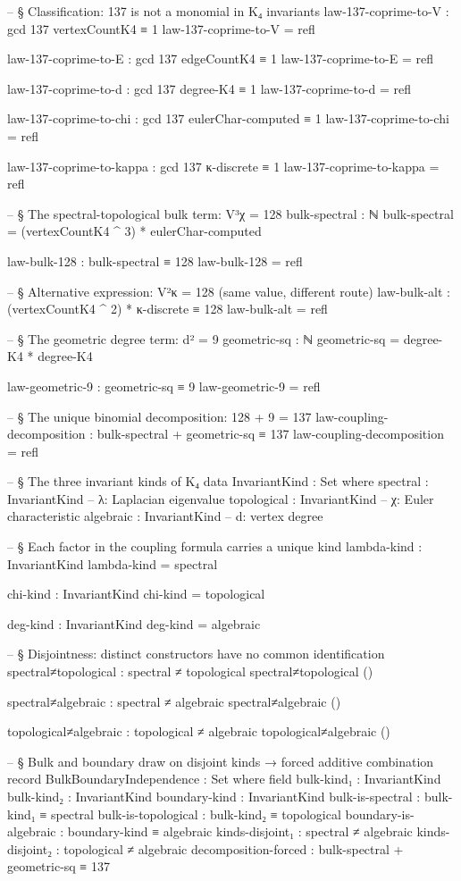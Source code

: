 \documentclass[11pt,a4paper]{book}
\begin{document}
\begin{code}
-- § Classification: 137 is not a monomial in K₄ invariants
law-137-coprime-to-V : gcd 137 vertexCountK4 ≡ 1
law-137-coprime-to-V = refl

law-137-coprime-to-E : gcd 137 edgeCountK4 ≡ 1
law-137-coprime-to-E = refl

law-137-coprime-to-d : gcd 137 degree-K4 ≡ 1
law-137-coprime-to-d = refl

law-137-coprime-to-chi : gcd 137 eulerChar-computed ≡ 1
law-137-coprime-to-chi = refl

law-137-coprime-to-kappa : gcd 137 κ-discrete ≡ 1
law-137-coprime-to-kappa = refl

-- § The spectral-topological bulk term: V³χ = 128
bulk-spectral : ℕ
bulk-spectral = (vertexCountK4 ^ 3) * eulerChar-computed

law-bulk-128 : bulk-spectral ≡ 128
law-bulk-128 = refl

-- § Alternative expression: V²κ = 128 (same value, different route)
law-bulk-alt : (vertexCountK4 ^ 2) * κ-discrete ≡ 128
law-bulk-alt = refl

-- § The geometric degree term: d² = 9
geometric-sq : ℕ
geometric-sq = degree-K4 * degree-K4

law-geometric-9 : geometric-sq ≡ 9
law-geometric-9 = refl

-- § The unique binomial decomposition: 128 + 9 = 137
law-coupling-decomposition : bulk-spectral + geometric-sq ≡ 137
law-coupling-decomposition = refl


-- § The three invariant kinds of K₄
data InvariantKind : Set where
  spectral    : InvariantKind   -- λ: Laplacian eigenvalue
  topological : InvariantKind   -- χ: Euler characteristic
  algebraic   : InvariantKind   -- d: vertex degree

-- § Each factor in the coupling formula carries a unique kind
lambda-kind : InvariantKind
lambda-kind = spectral

chi-kind : InvariantKind
chi-kind = topological

deg-kind : InvariantKind
deg-kind = algebraic

-- § Disjointness: distinct constructors have no common identification
spectral≠topological : spectral ≠ topological
spectral≠topological ()

spectral≠algebraic : spectral ≠ algebraic
spectral≠algebraic ()

topological≠algebraic : topological ≠ algebraic
topological≠algebraic ()

-- § Bulk and boundary draw on disjoint kinds → forced additive combination
record BulkBoundaryIndependence : Set where
  field
    bulk-kind₁            : InvariantKind
    bulk-kind₂            : InvariantKind
    boundary-kind         : InvariantKind
    bulk-is-spectral      : bulk-kind₁ ≡ spectral
    bulk-is-topological   : bulk-kind₂ ≡ topological
    boundary-is-algebraic : boundary-kind ≡ algebraic
    kinds-disjoint₁       : spectral ≠ algebraic
    kinds-disjoint₂       : topological ≠ algebraic
    decomposition-forced  : bulk-spectral + geometric-sq ≡ 137


\end{code}
\end{document}
